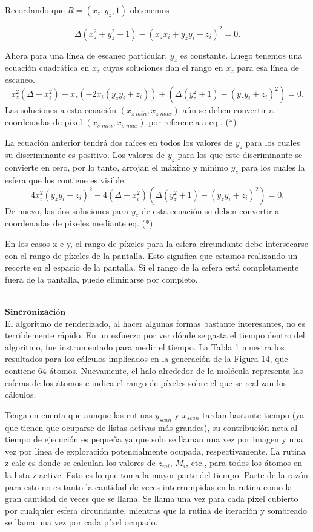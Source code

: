 Recordando que $R = (x_z, y_z, 1)$ obtenemos

\[
	\Delta (x^{2}_{z} + y^{2}_{z} + 1) - (x_z x_i + y_z y_i + z_i)^2 = 0.
\]

Ahora para una línea de escaneo particular, $y_z$ es constante. Luego tenemos una ecuación cuadrática en $x_z$ cuyas soluciones dan el rango en $x_z$ para esa línea de escaneo.
\[
	x^{2}_{z} (\Delta - x^{2}_{i}) + x_z (-2 x_i (y_z y_i + z_i)) + (\Delta (y^{2}_{z} + 1) - (y_z y_i + z_i)^2) = 0.
\]
Las soluciones a esta ecuación $(x_ {z \; min}, x_ {z \; max})$ aún se deben convertir a coordenadas de píxel $(x_ {s \; min}, x_ {s \; max})$ por referencia a eq . (*)

La ecuación anterior tendrá dos raíces en todos los valores de $ y_z $ para los cuales su discriminante es positivo. Los valores de $ y_z $ para los que este discriminante se convierte en cero, por lo tanto, arrojan el máximo y mínimo $ y_z $ para los cuales la esfera que los contiene es visible.
\[
	4 x^{2}_{i}(y_z y_i + z_i)^2 - 4(\Delta - x^{2}_{i})(\Delta (y^{2}_{z} +1) - (y_z y_i + z_i)^2 ) = 0.
\]
De nuevo, las dos soluciones para $ y_z $ de esta ecuación se deben convertir a coordenadas de píxeles mediante eq. (*)

En los casos x e y, el rango de píxeles para la esfera circundante debe intersecarse con el rango de píxeles de la pantalla. Esto significa que estamos realizando un recorte en el espacio de la pantalla. Si el rango de la esfera está completamente fuera de la pantalla, puede eliminarse por completo.

${ }$\\
$\textbf{Sincronización}$
${ }$\\

El algoritmo de renderizado, al hacer algunas formas bastante interesantes, no es terriblemente rápido. En un esfuerzo por ver dónde se gasta el tiempo dentro del algoritmo, fue instrumentado para medir el tiempo. La Tabla 1 muestra los resultados para los cálculos implicados en la generación de la Figura 14, que contiene 64 átomos. Nuevamente, el halo alrededor de la molécula representa las esferas de los átomos e indica el rango de píxeles sobre el que se realizan los cálculos.

Tenga en cuenta que aunque las rutinas $y_ {scan}$ y $x_ {scan}$ tardan bastante tiempo (ya que tienen que ocuparse de listas activas más grandes), su contribución neta al tiempo de ejecución es pequeña ya que solo se llaman una vez por imagen y una vez por línea de exploración potencialmente ocupada, respectivamente. La rutina z calc es donde se calculan los valores de $z_ {mi}$, $M_i$, etc., para todos los átomos en la lista z-active. Esto es lo que toma la mayor parte del tiempo. Parte de la razón para esto no es tanto la cantidad de veces interrumpidas en la rutina como la gran cantidad de veces que se llama. Se llama una vez para cada píxel cubierto por cualquier esfera circundante, mientras que la rutina de iteración y sombreado se llama una vez por cada píxel ocupado.


